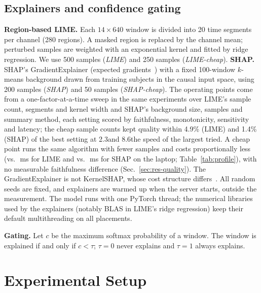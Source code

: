 \documentclass[conference]{IEEEtran}
\newcommand{\ms}{\,ms\xspace}
\begin{document}
\subsection{Explainers and confidence gating}
\textbf{Region-based LIME.} Each $14\times640$ window is divided into 20
time segments per channel (280 regions). A masked region is replaced by the
channel mean; perturbed samples are weighted with an exponential kernel and
fitted by ridge regression. We use 500 samples (\emph{LIME}) and 250
samples (\emph{LIME-cheap}). \textbf{SHAP.} SHAP's GradientExplainer
(expected gradients~\cite{erion2021}) with a fixed 100-window $k$-means
background drawn from training subjects in the causal input space, using
200 samples (\emph{SHAP}) and 50 samples (\emph{SHAP-cheap}). The
operating points come from a one-factor-at-a-time sweep in the same
experiments over LIME's sample count, segments and kernel width and
SHAP's background size, samples and summary method, each setting scored
by faithfulness, monotonicity, sensitivity and latency; the cheap sample
counts kept quality within 4.9\% (LIME) and 1.4\% (SHAP) of the best
setting at 2.3\x and 8.6\x the speed of the largest tried.
A cheap point runs the same algorithm with fewer samples and costs
proportionally less (\ColocLimeCXaiMed vs.\ \ColocLimeXaiMed\ms for
LIME and \ColocShapCXaiMed vs.\ \ColocShapXaiMed\ms for SHAP on the
laptop; Table~\ref{tab:profile}), with no measurable faithfulness
difference (Sec.~\ref{sec:res-quality}). The
GradientExplainer is not KernelSHAP, whose cost structure
differs~\cite{warnecke2020}.
All random seeds are fixed, and explainers are warmed up when the server
starts, outside the measurement. The model runs with one PyTorch thread;
the numerical libraries used by the explainers (notably BLAS in LIME's
ridge regression) keep their default multithreading on all placements.

\textbf{Gating.} Let $c$ be the maximum softmax probability of a window.
The window is explained if and only if $c<\tau$; $\tau=0$ never explains
and $\tau=1$ always explains.

\section{Experimental Setup}
\end{document}
